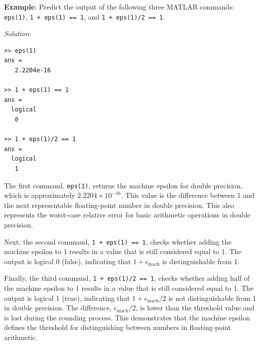 \begin{exampleBox}
  \textbf{Example}: Predict the output of the following three MATLAB commands: \texttt{eps(1)}, \texttt{1 + eps(1) == 1}, and \texttt{1 + eps(1)/2 == 1}.

  \emph{Solution}:
\begin{verbatim}
>> eps(1)
ans =
   2.2204e-16

>> 1 + eps(1) == 1
ans =
  logical
   0

>> 1 + eps(1)/2 == 1
ans =
  logical
   1
\end{verbatim}
  The first command, \texttt{eps(1)}, returns the machine epsilon for double precision, which is approximately \(2.2204 \times 10^{-16}\). This value is the difference between 1 and the next representable floating-point number in double precision. This also represents the worst-case relative error for basic arithmetic operations in double precision. 

  Next, the second command, \texttt{1 + eps(1) == 1}, checks whether adding the machine epsilon to 1 results in a value that is still considered equal to 1. The output is logical 0 (false), indicating that \(1 + \epsilon_{\text{mach}}\) is distinguishable from 1.

  Finally, the third command, \texttt{1 + eps(1)/2 == 1}, checks whether adding half of the machine epsilon to 1 results in a value that is still considered equal to 1.
  The output is logical 1 (true), indicating that \(1 +{\epsilon_{\text{mach}}}/{2}\) is not distinguishable from 1 in double precision.
  The difference, ${\epsilon_{\text{mach}}}/{2}$, is lower than the threshold value and is lost during the rounding process.
  This demonstrates that the machine epsilon defines the threshold for distinguishing between numbers in floating-point arithmetic.
\end{exampleBox}


